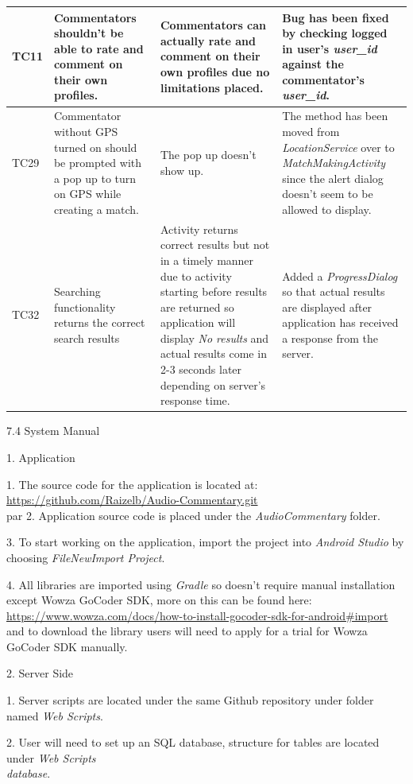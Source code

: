 \documentclass{article}
\begin{document}
\begin{flushleft}
\begin{longtable}[l]{|p{1.2cm}|p{4cm}|p{4cm}|p{5cm}|}
\hline
TC11 & Commentators shouldn't be able to rate and comment on their own profiles. & Commentators can actually rate and comment on their own profiles due no limitations placed. & Bug has been fixed by checking logged in user's \textit{user\_id} against the commentator's \textit{user\_id}.\\
\hline
TC29 & Commentator without GPS turned on should be prompted with a pop up to turn on GPS while creating a match. & The pop up doesn't show up. & The method has been moved from \textit{LocationService} over to \textit{MatchMakingActivity} since the alert dialog doesn't seem to be allowed to display.\\
\hline
TC32 & Searching functionality returns the correct search results & Activity returns correct results but not in a timely manner due to activity starting before results are returned so application will display \textit{No results} and actual results come in 2-3 seconds later depending on server's response time. & Added a \textit{ProgressDialog} so that actual results are displayed after application has received a response from the server.\\
\hline
\end{longtable}
{\Large 7.4 System Manual}\par
{\large 1. Application}\par
1. The source code for the application is located at: \url{https://github.com/Raizelb/Audio-Commentary.git}\\par
2. Application source code is placed under the \textit{AudioCommentary} folder.\par
3. To start working on the application, import the project into \textit{Android Studio} by choosing \textit{File\textrightarrow New\textrightarrow Import Project}.\par
4. All libraries are imported using \textit{Gradle} so doesn't require manual installation except Wowza GoCoder SDK, more on this can be found here: \url{https://www.wowza.com/docs/how-to-install-gocoder-sdk-for-android#import} and to download the library users will need to apply for a trial for Wowza GoCoder SDK manually.\par
{\large 2. Server Side}\par
1. Server scripts are located under the same Github repository under folder named \textit{Web Scripts}.\par
2. User will need to set up an SQL database, structure for tables are located under \textit{Web Scripts\\database}.\par

\end{flushleft}
\end{document}
